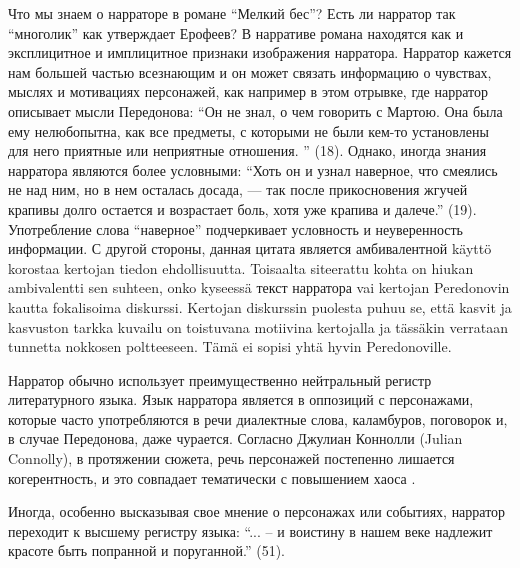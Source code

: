 \documentclass[12pt,a4paper]{article}
\begin{document}
Что мы знаем о нарраторе в романе \enquote{Мелкий бес}?
Есть ли нарратор так \enquote{многолик} как утверждает Ерофеев? В нарративе романа находятся как и эксплицитное и имплицитное признаки изображения нарратора. Нарратор кажется нам большей частью всезнающим и он может связать информацию о чувствах, мыслях и мотивациях персонажей, как например в этом отрывке, где нарратор описывает мысли Передонова:  \enquote{Он не знал, о чем говорить с Мартою. Она была ему нелюбопытна,
как все предметы, с которыми не были кем-то установлены для него
приятные или неприятные отношения.
} (18). Однако, иногда знания нарратора являются более условными: \enquote{Хоть он и узнал наверное, что смеялись не над ним, но в нем осталась досада, — так после прикосновения жгучей крапивы долго остается и  возрастает боль, хотя уже крапива и далече.} (19). Употребление слова \enquote{наверное} подчеркивает условность и неуверенность информации. С другой стороны, данная цитата является амбивалентной käyttö korostaa kertojan tiedon ehdollisuutta. Toisaalta siteerattu kohta on hiukan ambivalentti sen suhteen, onko kyseessä текст нарратора vai kertojan Peredonovin kautta fokalisoima diskurssi. Kertojan diskurssin puolesta puhuu se, että kasvit ja kasvuston tarkka kuvailu on toistuvana motiivina kertojalla ja tässäkin verrataan tunnetta nokkosen poltteeseen. Tämä ei sopisi yhtä hyvin Peredonoville. 

Нарратор обычно использует преимущественно нейтральный регистр литературного языка. Язык нарратора является в оппозиций с персонажами, которые часто употребляются в речи диалектные слова, каламбуров, поговорок и, в случае Передонова, даже чурается. Согласно Джулиан Коннолли (Julian Connolly), в протяжении сюжета, речь персонажей постепенно лишается когерентность, и это совпадает тематически с повышением хаоса \parencite[358--359]{connolly1981}.

Иногда, особенно высказывая свое мнение о персонажах или событиях, нарратор переходит к высшему регистру языка: \enquote{... – и воистину в нашем веке надлежит красоте быть попранной и поруганной.} (51).

\end{document}
